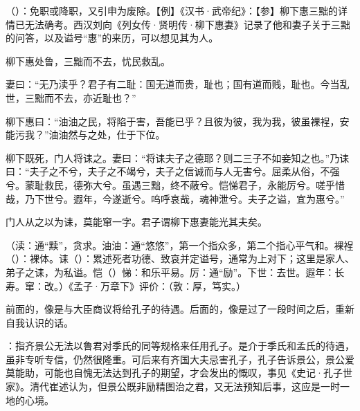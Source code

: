 {
\item {}（）：免职或降职，又引申为废除。【例】《汉书·武帝纪》：【参】柳下惠三黜的详情已无法确考。西汉刘向《列女传·贤明传·柳下惠妻》记录了他和妻子关于三黜的问答，以及谥号“惠”的来历，可以想见其为人。
\begin{lyquotepara}
柳下惠处鲁，三黜而不去，忧民救乱。

妻曰：“无乃渎乎？君子有二耻：国无道而贵，耻也；国有道而贱，耻也。今当乱世，三黜而不去，亦近耻也？”

柳下惠曰：“油油之民，将陷于害，吾能已乎？且彼为彼，我为我，彼虽裸裎，安能污我？”油油然与之处，仕于下位。

柳下既死，门人将诔之。妻曰：“将诔夫子之德耶？则二三子不如妾知之也。”乃诔曰：“夫子之不兮，夫子之不竭兮，夫子之信诚而与人无害兮。屈柔从俗，不强兮。蒙耻救民，德弥大兮。虽遇三黜，终不蔽兮。恺悌君子，永能厉兮。嗟乎惜哉，乃下世兮。遐年，今遂逝兮。呜呼哀哉，魂神泄兮。夫子之谥，宜为惠兮。”

门人从之以为诔，莫能窜一字。君子谓柳下惠妻能光其夫矣。
\end{lyquotepara}
（渎：通“黩”，贪求。油油：通“悠悠”，第一个指众多，第二个指心平气和。裸裎（）：裸体。诔（）：累述死者功德、致哀并定谥号，通常为上对下；这里是家人、弟子之诔，为私谥。恺（）悌：和乐平易。厉：通“励”。下世：去世。遐年：长寿。窜：改。）《孟子·万章下》评价：（敦：厚，笃实。）
}
{}


{
\item 前面的，像是与大臣商议将给孔子的待遇。后面的，像是过了一段时间之后，重新自我认识的话。
\item {}：指齐景公无法以鲁君对季氏的同等规格来任用孔子。是介于季氏和孟氏的待遇，虽非专听专信，仍然很隆重。可后来有齐国大夫忌害孔子，孔子告诉景公，景公爱莫能助，可能也自愧无法达到孔子的期望，才会发出的慨叹，事见《史记·孔子世家》。清代崔述认为，但景公既非励精图治之君，又无法预知后事，这应是一时一地的心境。%
}
{}


